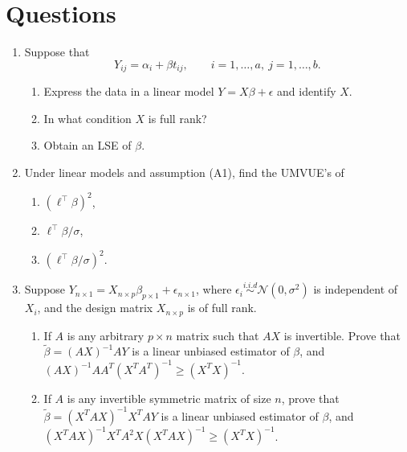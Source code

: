 \documentclass[12pt]{extarticle}
\begin{document}
\section{Questions}
\begin{enumerate}
	\item Suppose that
	$$Y_{ij}=\alpha_{i}+\beta t_{ij},\qquad i=1,\dots,a, \ j=1,\dots, b.$$
	\begin{enumerate}
		\item Express the data in a linear model $Y=X\beta+\epsilon$ and identify $X$.
		\item In what condition $X$ is full rank?
		\item Obtain an LSE of $\beta.$
	\end{enumerate}	
\vspace{3cm}
	\item Under linear models and assumption (A1), find the UMVUE's of 
	\begin{enumerate}
	\item $(\ell^\top\beta)^2$, 
	\item $\ell^\top\beta/\sigma$,
	\item $(\ell^\top\beta/\sigma)^2.$
	\end{enumerate}  
	
	
		\vspace{3cm}
	\item Suppose $Y_{n\times 1} = X_{n\times p}\beta_{p\times 1} + \epsilon_{n\times 1}$, where $\epsilon_i\overset{i.i.d}{\sim}\mathcal N(0,\sigma^2)$ is independent of $X_i$, and the design matrix $X_{n\times p}$ is of full rank.
	\begin{enumerate}
		\item If $A$ is any arbitrary $p\times n$ matrix such that $AX$ is invertible. Prove that $\tilde \beta = (AX)^{-1}AY$ is a linear unbiased estimator of $\beta$, and $(AX)^{-1}AA^T(X^TA^T)^{-1}\geq (X^TX)^{-1}$.
		\item If $A$ is any invertible symmetric matrix of size $n$, prove that $\tilde \beta = (X^TAX)^{-1}X^TAY$ is a linear unbiased estimator of $\beta$, and $(X^TAX)^{-1}X^TA^2X(X^TAX)^{-1}\geq (X^TX)^{-1}$.
	\end{enumerate}
\end{enumerate}
\end{document}
